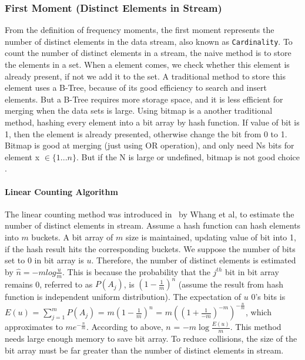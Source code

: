 \subsubsection{First Moment (Distinct Elements in Stream)}

From the definition of frequency moments, the first moment represents
the number of distinct elements in the data stream, also known as
\texttt{Cardinality}. To count the number of distinct elements in a stream, the
naive method is to store the elements in a set. When a element comes, we
check whether this element is already present, if not we add it to the set.
A traditional method to store this element uses a B-Tree, because of
its good efficiency to search and insert elements. But a B-Tree requires more
storage space, and it is less efficient for merging when the data sets is large. Using
bitmap is a another traditional method, hashing every element into a bit array
by hash function. If value of bit is 1, then the element is already presented,
otherwise change the bit from 0 to 1. Bitmap is good at merging (just using OR
operation), and only need Ns bits for element x $\in \{1...n\}$. But if the N is
large or undefined, bitmap is not good choice .

\paragraph{Linear Counting Algorithm}

The linear counting method was introduced in~\cite{whang1990linear} by Whang et
al, to estimate the number of distinct elements in stream. Assume a hash function
can hash elements into $m$ buckets. A bit array of $m$ size is maintained,
updating value of bit into 1, if the hash result hits the corresponding buckets.
We suppose the number of bits set to 0 in bit array is $u$. Therefore, the number
of distinct elements is estimated by $\hat{n} = -mlog\frac{u}{m}$. This is
because the probability that the $j^{th}$ bit in bit array remains 0, referred
to as $P(A_j)$, is $(1-\frac{1}{m})^n$ (assume the result from hash function is
independent uniform distribution). The expectation of $u$ 0's bits is $E(u)$ =
$\sum_{j=1}^{m} P(A_j)$ = $m(1-\frac{1}{m})^n$ =
$m((1+\frac{1}{-m})^{-m})^{-\frac{n}{m}}$, which approximates to
$me^{-\frac{n}{m}}$. 
According to above, $n$ = $-m\log{\frac{E(u)}{m}}$. This method needs large
enough memory to save bit array. To reduce collisions, the size of
the bit array must be far greater
than the number of distinct elements in stream.

